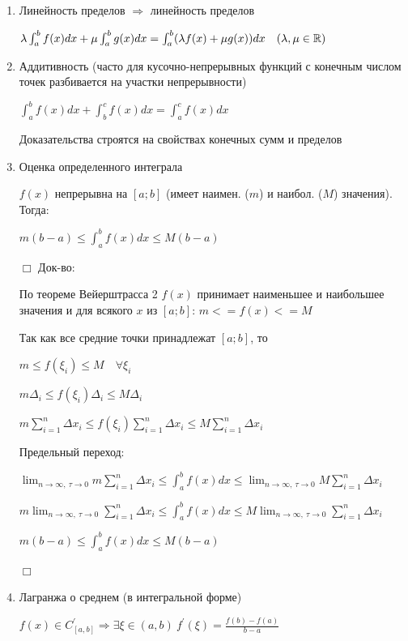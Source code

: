 \documentclass[12pt]{article}
\begin{document}
    \begin{enumerate}
        \item Линейность пределов $\Longrightarrow$ линейность пределов

        $\lambda \int^b_a f(x)dx + \mu \int^b_a g(x)dx = \int^b_a (\lambda f(x) + \mu g(x)) dx \quad (\lambda, \mu \in \mathbb{R})$

        \item Аддитивность (часто для кусочно-непрерывных функций с конечным числом точек разбивается на участки непрерывности)

        $\int^b_a f(x)dx + \int^c_b f(x)dx = \int^c_a f(x)dx$

        Доказательства строятся на свойствах конечных сумм и пределов

        \item Оценка определенного интеграла

        $f(x)$ непрерывна на $[a; b]$ (имеет наимен. ($m$) и наибол. ($M$) значения). Тогда:

        $m (b-a) \leq \int^b_a f(x)dx \leq M(b - a)$

        $\Box$ Док-во:

        По теореме Вейерштрасса 2 $f(x)$ принимает наименьшее и наибольшее значения и для всякого $x$ из $[a; b]$:  $m <= f(x) <= M$

        Так как все средние точки принадлежат $[a; b]$, то

        $m \leq f(\xi_i) \leq M \quad \forall \xi_i$

        $m \Delta_i \leq f(\xi_i) \Delta_i \leq M \Delta_i$

        $m \sum_{i=1}^n \Delta x_i \leq f(\xi_i) \sum_{i=1}^n \Delta x_i \leq M \sum_{i=1}^n \Delta x_i$

        Предельный переход:

        $\lim_{n\to\infty,\ \tau\to0} m \sum_{i=1}^n \Delta x_i \leq \int^b_a f(x) dx \leq \lim_{n\to\infty,\ \tau\to0} M \sum_{i=1}^n \Delta x_i$

        $m \lim_{n\to\infty,\ \tau\to0} \sum_{i=1}^n \Delta x_i \leq \int^b_a f(x) dx \leq M \lim_{n\to\infty,\ \tau\to0} \sum_{i=1}^n \Delta x_i$

        $m (b - a) \leq \int^b_a f(x) dx \leq M (b - a)$

        $\Box$


        \item \Th Лагранжа о среднем (в интегральной форме)

        $f(x) \in C^\prime_{[a,b]} \Longrightarrow \exists \xi \in (a, b) \ f^\prime(\xi) = \frac{f(b) - f(a)}{b - a}$


\end{enumerate}
\end{document}

